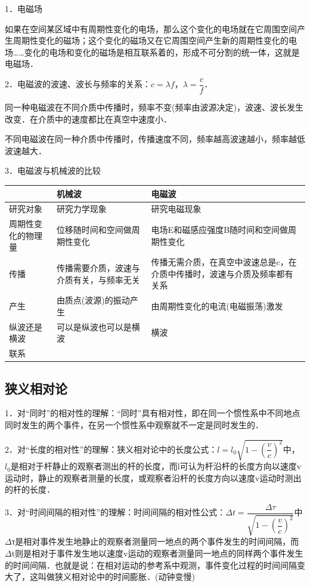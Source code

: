 1．电磁场

如果在空间某区域中有周期性变化的电场，那么这个变化的电场就在它周围空间产生周期性变化的磁场；这个变化的磁场又在它周围空间产生新的周期性变化的电场\ldots\ldots 变化的电场和变化的磁场是相互联系着的，形成不可分割的统一体，这就是电磁场．

2．电磁波的波速、波长与频率的关系：$c=\lambda f$，$\lambda=\dfrac{c}{f}$．

同一种电磁波在不同介质中传播时，频率不变(频率由波源决定)，波速、波长发生改变．在介质中的速度都比在真空中速度小．

不同电磁波在同一种介质中传播时，传播速度不同，频率越高波速越小，频率越低波速越大．

3．电磁波与机械波的比较

\begin{longtable}[]{@{}m{2cm}m{5cm}m{5cm}@{}}
\toprule
& 机械波 & 电磁波\tabularnewline
\midrule
\endhead
研究对象 & 研究力学现象 & 研究电磁现象\tabularnewline
周期性变化的物理量 & 位移随时间和空间做周期性变化 &
电场E和磁感应强度B随时间和空间做周期性变化\tabularnewline
传播 & 传播需要介质，波速与介质有关，与频率无关 &
传播无需介质，在真空中波速总是c，在介质中传播时，波速与介质及频率都有关系\tabularnewline
产生 & 由质点(波源)的振动产生 &
由周期性变化的电流(电磁振荡)激发\tabularnewline
纵波还是横波 & 可以是纵波也可以是横波 & 横波\tabularnewline
联系 &
\tabularnewline
\bottomrule
\end{longtable}

\newpage
\subsection{狭义相对论}

1．对``同时''的相对性的理解：``同时''具有相对性，即在同一个惯性系中不同地点同时发生的两个事件，在另一个惯性系中观察就不一定是同时发生的．

2．对``长度的相对性''的理解：狭义相对论中的长度公式：$l=l_0\sqrt{1-(\dfrac{v}{c})^2}$中，$l_0$是相对于杆静止的观察者测出的杆的长度，而l可认为杆沿杆的长度方向以速度v运动时，静止的观察者测量的长度，或观察者沿杆的长度方向以速度v运动时测出的杆的长度．

3．对``时间间隔的相对性''的理解：时间间隔的相对性公式：$\Delta t=\dfrac{\Delta\tau}{\sqrt{1-(\dfrac{v}{c})^2}}$中$\Delta$τ是相对事件发生地静止的观察者测量同一地点的两个事件发生的时间间隔，而$\Delta$t则是相对于事件发生地以速度v运动的观察者测量同一地点的同样两个事件发生的时间间隔．也就是说：在相对运动的参考系中观测，事件变化过程的时间间隔变大了，这叫做狭义相对论中的时间膨胀．(动钟变慢)

